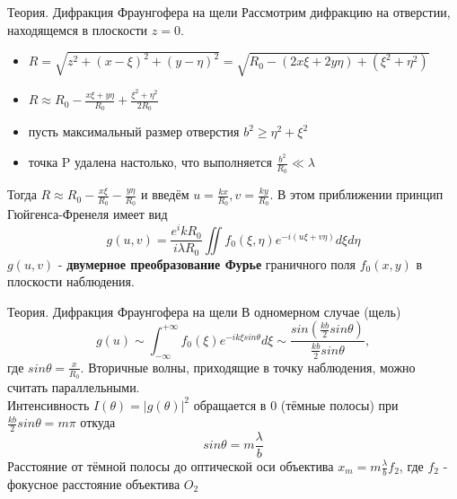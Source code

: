 \documentclass[11pt]{beamer} %
\begin{document}
    \begin{frame}{Теория. Дифракция Фраунгофера на щели}
        Рассмотрим дифракцию на отверстии, находящемся в плоскости $z=0$.
        \begin{itemize}
            \item $R = \sqrt{z^2+(x-\xi)^2+(y-\eta)^2} = \sqrt{R_0 - (2x\xi+2y\eta)+(\xi^2+\eta^2)}$
            \item $R \approx R_0 - \frac{x\xi + y\eta}{R_0} + \frac{\xi^2 + \eta^2}{2R_0}$
            \item пусть максимальный размер отверстия $b^2 \geq \eta^2 + \xi^2$
            \item точка P удалена настолько, что выполняется $\frac{b^2}{R_0} \ll \lambda$
        \end{itemize}
        Тогда $R \approx R_0 - \frac{x\xi}{R_0} - \frac{y\eta}{R_0}$ и введём $u = \frac{kx}{R_0}, v = \frac{ky}{R_0}$. В этом приближении принцип Гюйгенса-Френеля имеет вид
        \begin{equation}
            g(u,v) = \frac{e^ikR_0}{i\lambda R_0}\iint f_0(\xi, \eta)e^{-i(u\xi + v\eta)}d\xi d\eta
        \end{equation}
        $g(u,v)$ - \textbf{двумерное преобразование Фурье} граничного поля $f_0(x,y)$ в плоскости наблюдения.
    \end{frame}

    \begin{frame}{Теория. Дифракция Фраунгофера на щели}
        В одномерном случае (щель) 
        \begin{equation}
            g(u) \sim \int_{-\infty}^{+\infty}f_0(\xi)e^{-ik\xi sin\theta}d\xi \sim \frac{sin(\frac{kb}{2}sin\theta)}{\frac{kb}{2}sin\theta},
        \end{equation}
        где $sin\theta = \frac{x}{R_0}$. Вторичные волны, приходящие в точку наблюдения, можно считать параллельными. \\
        Интенсивность $I(\theta) = |g(\theta)|^2$ обращается в 0 (тёмные полосы) при $\frac{kb}{2}sin\theta = m\pi$ откуда 
        \begin{equation}
            sin\theta = m\frac{\lambda}{b}
        \end{equation}
        Расстояние от тёмной полосы до оптической оси объектива $x_m = m\frac{\lambda}{b}f_2$, где $f_2$ - фокусное расстояние объектива $O_2$
    \end{frame}
\end{document}

